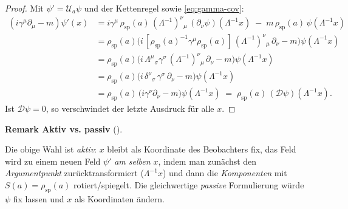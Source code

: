\documentclass[10pt, letterpaper]{article}
\newcommand{\CustomHeading}[3]{%
  \par\medskip\noindent%
  \textbf{#1 #2} \textnormal{(#3)}.\enskip%
}
\newenvironment{REM}[2]{\begin{unitbox}\CustomHeading{Remark}{#1}{#2}}{\end{unitbox}}
\begin{document}
\begin{proof}
Mit $\psi'=\mathcal U_a\psi$ und der Kettenregel sowie \eqref{eq:gamma-cov}:
\[
\begin{aligned}
(i\gamma^\mu\partial_\mu - m)\psi'(x)
&= i\gamma^\mu\,\rho_{\mathrm{sp}}(a)\,(\Lambda^{-1})^\nu{}_\mu\,(\partial_\nu\psi)(\Lambda^{-1}x)
\;-\;m\,\rho_{\mathrm{sp}}(a)\,\psi(\Lambda^{-1}x)\\[2mm]
&= \rho_{\mathrm{sp}}(a)\Big(i\,[\rho_{\mathrm{sp}}(a)^{-1}\gamma^\mu\rho_{\mathrm{sp}}(a)]
\,(\Lambda^{-1})^\nu{}_\mu\,\partial_\nu - m\Big)\psi(\Lambda^{-1}x)\\[1mm]
&= \rho_{\mathrm{sp}}(a)\Big(i\,\Lambda^\mu{}_{\sigma}\gamma^\sigma
\,(\Lambda^{-1})^\nu{}_\mu\,\partial_\nu - m\Big)\psi(\Lambda^{-1}x)\\[1mm]
&= \rho_{\mathrm{sp}}(a)\Big(i\,\delta^\nu{}_{\sigma}\,\gamma^\sigma\,\partial_\nu - m\Big)\psi(\Lambda^{-1}x)\\
&= \rho_{\mathrm{sp}}(a)\,\big(i\gamma^\nu\partial_\nu - m\big)\psi(\Lambda^{-1}x)
\;=\; \rho_{\mathrm{sp}}(a)\,(\mathcal D\psi)(\Lambda^{-1}x).
\end{aligned}
\]
Ist $\mathcal D\psi=0$, so verschwindet der letzte Ausdruck für alle $x$.
\end{proof}

\begin{REM}{Aktiv vs. passiv}{}
Die obige Wahl ist \emph{aktiv}: $x$ bleibt als Koordinate des Beobachters fix,
das Feld wird zu einem neuen Feld $\psi'$ \emph{am selben $x$}, indem man zunächst den
\emph{Argumentpunkt} zurücktransformiert ($\Lambda^{-1}x$) und dann die
\emph{Komponenten} mit $S(a)=\rho_{\mathrm{sp}}(a)$ rotiert/spiegelt.
Die gleichwertige \emph{passive} Formulierung würde $\psi$ fix lassen und $x$
als Koordinaten ändern.
\end{REM}
\end{document}
